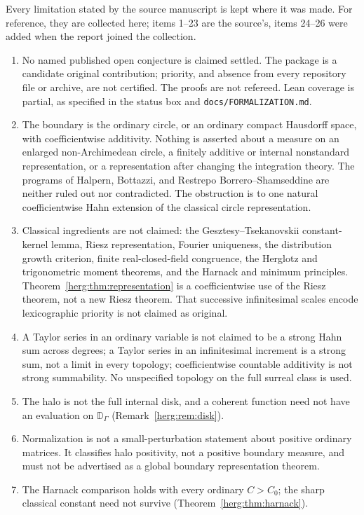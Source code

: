 \documentclass[11pt,letterpaper]{article}
\theoremstyle{definition}
\newcommand{\D}{\mathbb D}\newcommand{\No}{\mathbf{No}}
\newcommand{\repo}[1]{\nolinkurl{#1}}%
\numberwithin{equation}{section}
\begin{document}
Every limitation stated by the source manuscript is kept where it was made. For reference, they are collected here; items 1--23 are the source's, items 24--26 were added when the report joined the collection.
\begin{enumerate}[label=\arabic*.,leftmargin=2.2em]
\item No named published open conjecture is claimed settled. The package is a candidate original contribution; priority, and absence from every repository file or archive, are not certified. The proofs are not refereed. Lean coverage is partial, as specified in the status box and \repo{docs/FORMALIZATION.md}.
\item The boundary is the ordinary circle, or an ordinary compact Hausdorff space, with coefficientwise additivity. Nothing is asserted about a measure on an enlarged non-Archimedean circle, a finitely additive or internal nonstandard representation, or a representation after changing the integration theory. The programs of Halpern, Bottazzi, and Restrepo Borrero--Shamseddine are neither ruled out nor contradicted. The obstruction is to one natural coefficientwise Hahn extension of the classical circle representation.
\item Classical ingredients are not claimed: the Gesztesy--Tsekanovskii constant-kernel lemma, Riesz representation, Fourier uniqueness, the distribution growth criterion, finite real-closed-field congruence, the Herglotz and trigonometric moment theorems, and the Harnack and minimum principles. Theorem~\ref{herg:thm:representation} is a coefficientwise use of the Riesz theorem, not a new Riesz theorem. That successive infinitesimal scales encode lexicographic priority is not claimed as original.
\item A Taylor series in an ordinary variable is not claimed to be a strong Hahn sum across degrees; a Taylor series in an infinitesimal increment is a strong sum, not a limit in every topology; coefficientwise countable additivity is not strong summability. No unspecified topology on the full surreal class is used.
\item The halo is not the full internal disk, and a coherent function need not have an evaluation on $\D_\Gamma$ (Remark~\ref{herg:rem:disk}).
\item Normalization is not a small-perturbation statement about positive ordinary matrices. It classifies halo positivity, not a positive boundary measure, and must not be advertised as a global boundary representation theorem.
\item The Harnack comparison holds with every ordinary $C>C_0$; the sharp classical constant need not survive (Theorem~\ref{herg:thm:harnack}).

\end{enumerate}
\end{document}
